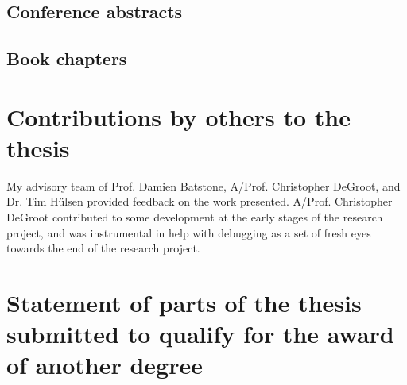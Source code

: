 

\subsection*{Conference abstracts}




\subsection*{Book chapters}




\section*{Contributions by others to the thesis}

My advisory team of Prof. Damien Batstone, A/Prof. Christopher DeGroot, and Dr. Tim H\"{u}lsen provided feedback on the work presented. A/Prof. Christopher DeGroot contributed to some development at the early stages of the research project, and was instrumental in help with debugging as a set of fresh eyes towards the end of the research project.

\section*{Statement of parts of the thesis submitted to qualify for the award of another degree}


